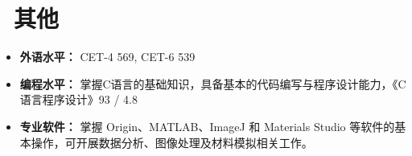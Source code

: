 \documentclass[11pt]{article}
\begin{document}
\section{\makebox[\widthof{\faUsers}][c]{\color{CVBlue}\faInfo}\ 其他}
\begin{itemize}[parsep=0.5ex]
    \item \textbf{外语水平：} CET-4  569, CET-6  539
    \item \textbf{编程水平：} 掌握C语言的基础知识，具备基本的代码编写与程序设计能力，《C语言程序设计》93 / 4.8
    \item \textbf{专业软件：} 掌握 Origin、MATLAB、ImageJ 和 Materials Studio 等软件的基本操作，可开展数据分析、图像处理及材料模拟相关工作。
\end{itemize}
\end{document}

